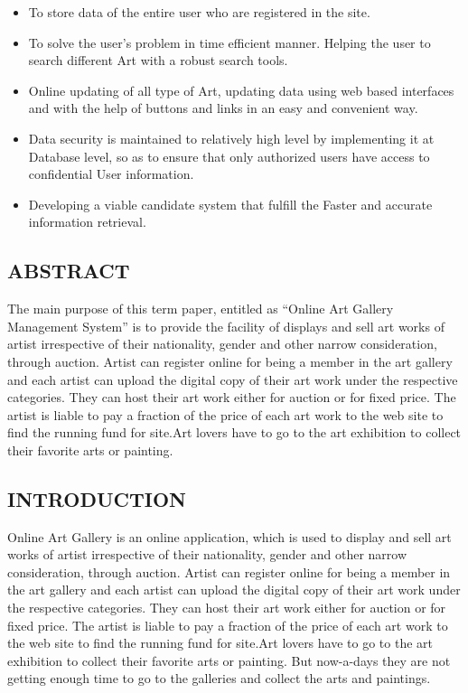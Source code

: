 \documentclass{article}
\begin{document}
\begin{itemize}
    \item To store data of the entire user who are registered in the site.
    \item To solve the user’s problem in time efficient manner. Helping the user to search different Art with a robust search tools.
    \item Online updating of all type of Art, updating data using web based interfaces and with the help of buttons and links in an easy and convenient way.
    \item Data security is maintained to relatively high level by implementing it at Database level, so as to ensure that only authorized users have access to confidential User information.
    \item Developing a viable candidate system that fulfill the Faster and accurate information retrieval.
\end{itemize}
\begin{center}
   \section*{\textbf{ABSTRACT}} 
\end{center}
The main purpose of this term paper, entitled as “Online Art Gallery Management System” is to provide the facility of displays and sell art works of artist irrespective of their nationality, gender and other narrow consideration, through auction. Artist can register online for being a member in the art gallery and each artist can upload the digital copy of their art work under the respective categories. They can host their art work either for auction or for fixed price. The artist is liable to pay a fraction of the price of each art work to the web site to find the running fund for site.Art lovers have to go to the art exhibition to collect their favorite arts or painting.
\\
\begin{center}
   \section*{\textbf{INTRODUCTION}} 
\end{center}
Online Art Gallery is an online application, which is used to display and sell art works of artist irrespective of their nationality, gender and other narrow consideration, through auction. Artist can register online for being a member in the art gallery and each artist can upload the digital copy of their art work under the respective categories. They can host their art work either for auction or for fixed price. The artist is liable to pay a fraction of the price of each art work to the web site to find the running fund for site.Art lovers have to go to the art exhibition to collect their favorite arts or painting. But now-a-days they are not getting enough time to go to the galleries and collect the arts and paintings.
\end{document}
